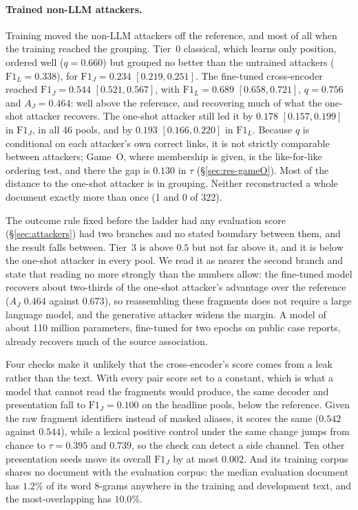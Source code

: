 \documentclass[sigconf,review]{acmart}
\newcommand{\FJ}{\ensuremath{\mathrm{F1}_{J}}}
\newcommand{\FL}{\ensuremath{\mathrm{F1}_{L}}}
\newcommand{\AJ}{\ensuremath{A_{J}}}
\begin{document}
\paragraph{Trained non-LLM attackers.} Training moved the non-LLM attackers off
the reference, and most of all when the training reached the grouping. Tier~0
classical, which learns only position, ordered well ($q = 0.660$) but grouped
no better than the untrained attackers ($\FL = 0.338$), for
$\FJ = 0.234$ $[0.219, 0.251]$. The fine-tuned cross-encoder reached
$\FJ = 0.544$ $[0.521, 0.567]$, with $\FL = 0.689$ $[0.658, 0.721]$,
$q = 0.756$ and $\AJ = 0.464$: well above the reference, and recovering much
of what the one-shot attacker recovers. The one-shot attacker still led it by
$0.178$ $[0.157, 0.199]$ in \FJ{}, in all 46 pools, and by $0.193$
$[0.166, 0.220]$ in \FL{}. Because $q$ is conditional on each attacker's own
correct links, it is not strictly comparable between attackers; Game~O, where
membership is given, is the like-for-like ordering test, and there the gap is
$0.130$ in $\tau$ (\S\ref{sec:res-gameO}). Most of the distance to the one-shot
attacker is in grouping. Neither reconstructed a whole document exactly more
than once (1 and 0 of 322).

The outcome rule fixed before the ladder had any evaluation score
(\S\ref{sec:attackers}) had two branches and no stated boundary between them,
and the result falls between. Tier~3 is above $0.5$ but not far above it, and
it is below the one-shot attacker in every pool. We read it as nearer the
second branch and state that reading no more strongly than the numbers allow:
the fine-tuned model recovers about two-thirds of the one-shot attacker's
advantage over the reference ($\AJ$ $0.464$ against $0.673$), so reassembling
these fragments does not require a large language model, and the generative
attacker widens the margin. A model of about 110 million parameters,
fine-tuned for two epochs on public case reports, already recovers much of the
source association.

Four checks make it unlikely that the cross-encoder's score comes from a leak
rather than the text. With every pair score set to a constant, which is what a
model that cannot read the fragments would produce, the same decoder and
presentation fall to $\FJ = 0.100$ on the headline pools, below the reference.
Given the raw fragment identifiers instead of
masked aliases, it scores the same ($0.542$ against $0.544$), while a lexical
positive control under the same change jumps from chance to $\tau = 0.395$ and
$0.739$, so the check can detect a side channel. Ten other presentation seeds
move its overall \FJ{} by at most $0.002$. And its training corpus shares no
document with the evaluation corpus: the median evaluation document has
$1.2\%$ of its word 8-grams anywhere in the training and development text,
and the most-overlapping has $10.0\%$.
\end{document}
